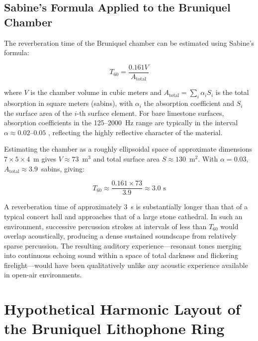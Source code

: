 \documentclass[12pt]{article}
\begin{document}
\subsection*{Sabine's Formula Applied to the Bruniquel Chamber}

The reverberation time of the Bruniquel chamber can be estimated using Sabine's formula:

\begin{equation}
T_{60} = \frac{0.161 V}{A_{\text{total}}}
\end{equation}

where $V$ is the chamber volume in cubic meters and $A_{\text{total}} = \sum_i \alpha_i S_i$ is the total absorption in square meters (sabins), with $\alpha_i$ the absorption coefficient and $S_i$ the surface area of the $i$-th surface element. For bare limestone surfaces, absorption coefficients in the 125--2000~Hz range are typically in the interval $\alpha \approx 0.02$--$0.05$ \citep{Mavko2009}, reflecting the highly reflective character of the material.

Estimating the chamber as a roughly ellipsoidal space of approximate dimensions $7 \times 5 \times 4$~m gives $V \approx 73$~m$^3$ and total surface area $S \approx 130$~m$^2$. With $\alpha = 0.03$, $A_{\text{total}} \approx 3.9$~sabins, giving:

\begin{equation}
T_{60} \approx \frac{0.161 \times 73}{3.9} \approx 3.0 \text{ s}
\end{equation}

A reverberation time of approximately 3~s is substantially longer than that of a typical concert hall and approaches that of a large stone cathedral. In such an environment, successive percussion strokes at intervals of less than $T_{60}$ would overlap acoustically, producing a dense sustained soundscape from relatively sparse percussion. The resulting auditory experience—resonant tones merging into continuous echoing sound within a space of total darkness and flickering firelight—would have been qualitatively unlike any acoustic experience available in open-air environments.

\section{Hypothetical Harmonic Layout of the Bruniquel Lithophone Ring}
\end{document}
